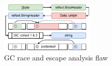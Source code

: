 \begin{figure}[!t]
    \vspace{2mm}
    \centering
    \includegraphics[width=0.4\textwidth]{gfx/figures/gcrace-vuln.pdf}
    \caption{GC race and escape analysis flaw}
    \label{fig:gcrace-vuln}
    \vspace{-8pt}
\end{figure}
